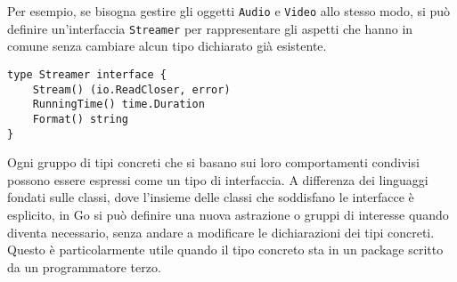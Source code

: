 \documentclass[../../thesis.tex]{subfiles}
\begin{document}
    Per esempio, se bisogna gestire gli oggetti \verb"Audio" e \verb"Video" allo stesso modo, si può definire un'interfaccia \verb"Streamer" per rappresentare gli aspetti che hanno in comune senza cambiare alcun tipo dichiarato già esistente.
    \begin{lstlisting}[frame = single, label = {lst:lstlisting6-3.7}]
type Streamer interface {
    Stream() (io.ReadCloser, error)
    RunningTime() time.Duration
    Format() string
}
    \end{lstlisting}
    Ogni gruppo di tipi concreti che si basano sui loro comportamenti condivisi possono essere espressi come un tipo di interfaccia.
    A differenza dei linguaggi fondati sulle classi, dove l'insieme delle classi che soddisfano le interfacce è esplicito, in Go si può definire una nuova astrazione o gruppi di interesse quando diventa necessario, senza andare a modificare le dichiarazioni dei tipi concreti.
    Questo è particolarmente utile quando il tipo concreto sta in un package scritto da un programmatore terzo.
\end{document}

